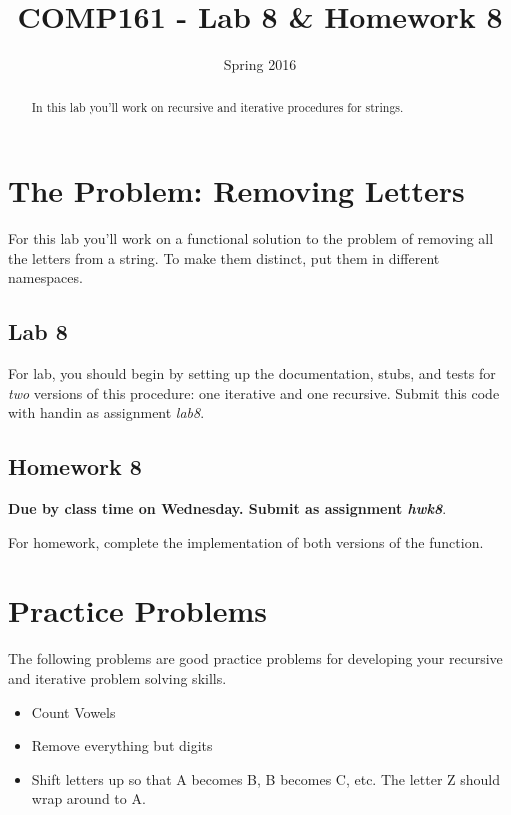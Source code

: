 \documentclass[nobib]{tufte-handout}
\title{COMP161 - Lab 8 \& Homework 8}
\author{}
\date{Spring 2016}
\begin{document}
\maketitle

\begin{abstract}
In this lab you'll work on recursive and iterative procedures for strings.
\end{abstract}

\section{The Problem: Removing Letters}

For this lab you'll work on a functional solution to the problem of removing all the letters from a string. To make them distinct, put them in different namespaces.  

\subsection*{Lab 8}

For lab, you should begin by setting up the documentation, stubs, and tests for \textit{two} versions of this procedure: one iterative and one recursive. Submit this code with handin as assignment \textit{lab8}.  

\subsection*{Homework 8}

\begin{center}
\textbf{Due by class time on Wednesday. Submit as assignment \textit{hwk8}}.
\end{center}

For homework, complete the implementation of both versions of the function.  

\section{Practice Problems}

The following problems are good practice problems for developing your recursive and iterative problem solving skills. 
\begin{itemize}
\item Count Vowels
\item Remove everything but digits
\item Shift letters up so that A becomes B, B becomes C, etc.  The letter Z should wrap around to A. 
\end{itemize}
\end{document}
